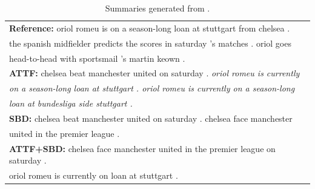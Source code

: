 \begin{table}[th!]
\begin{center}
\scriptsize
\begin{tabular}{|l|}%
\hline \textbf{Reference:} oriol romeu is on a season-long loan at stuttgart from chelsea . \\
       the spanish midfielder predicts the scores in saturday 's matches . oriol goes \\
	   head-to-head with sportsmail 's martin keown .\\
\hline \textbf{ATTF:} chelsea beat manchester united on saturday . \textit{oriol romeu is currently} \\
       \textit{on a season-long loan at stuttgart . oriol romeu is currently on a season-long} \\
	   \textit{loan at bundesliga side stuttgart .}\\
\hline \textbf{SBD:} chelsea beat manchester united on saturday . chelsea face manchester \\
       united in the premier league . \\ 
\hline \textbf{ATTF+SBD:} chelsea face manchester united in the premier league on saturday . \\
       oriol romeu is currently on loan at stuttgart . \\
\hline
\end{tabular}
\end{center}
\caption{Summaries generated from .}
\label{tab:src_rep}
\end{table}


